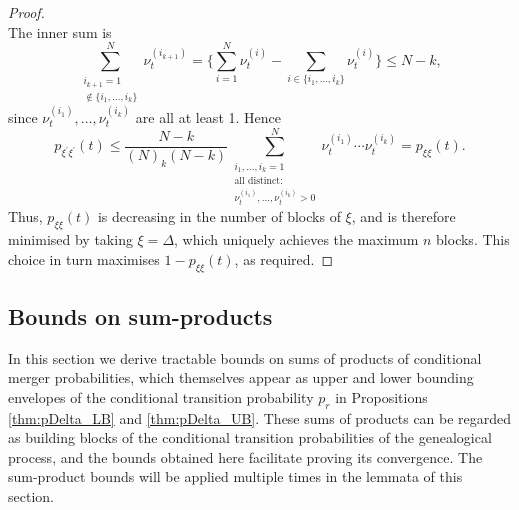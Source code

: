 \documentclass[12pt,authoryear]{article}
\theoremstyle{definition}
\newcommand{\1}[1]{\mathbbm{1}_{#1}}
\begin{document}
\begin{proof}
\begin{equation*}
\end{equation*}
The inner sum is
\begin{equation*}
\sum_{\substack{i_{k+1}=1 \\ \notin \{i_1,\ldots, i_k\} }}^N \nu_t^{(i_{k+1})} 
    = \Bigg\{ \sum_{i=1}^N \nu_t^{(i)} -  \sum_{i\in\{i_1,\dots,i_k\} } 
        \nu_t^{(i)} \Bigg\}
    \leq N - k ,
\end{equation*}
since $\nu_t^{(i_1)},\dots,\nu_t^{(i_k)} $ are all at least 1.
Hence
\begin{equation*}
p_{\xi^\prime\xi^\prime}(t)
    \leq  \frac{N-k}{(N)_k(N-k)} \sum_{\substack{i_1,\dots,i_k =1 
        \\ \text{all distinct:} \\ \nu_t^{(i_1)},\dots,\nu_t^{(i_k)} > 0 }}^N 
        \nu_t^{(i_1)} \cdots \nu_t^{(i_k)} 
    = p_{\xi\xi}(t) .
\end{equation*}
Thus, $p_{\xi\xi}(t)$ is decreasing in the number of blocks of $\xi$, and is therefore minimised by taking $\xi = \Delta$, which uniquely achieves the maximum $n$ blocks. This choice in turn maximises $1-p_{\xi\xi}(t)$, as required.
\end{proof}

\subsection{Bounds on sum-products}\label{sec:bounds_on_sum-products}

In this section we derive tractable bounds on sums of products of conditional merger probabilities, which themselves appear as upper and lower bounding envelopes of the conditional transition probability $p_r$ in Propositions \ref{thm:pDelta_LB} and \ref{thm:pDelta_UB}.
These sums of products can be regarded as building blocks of the conditional transition probabilities of the genealogical process, and the bounds obtained here facilitate proving its convergence. 
The sum-product bounds will be applied multiple times in the lemmata of this section.
\end{document}
